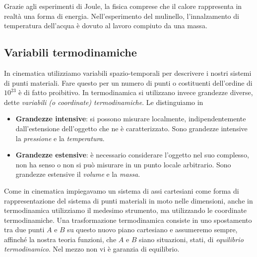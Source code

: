 Grazie agli esperimenti di Joule, la fisica comprese che il calore
rappresenta in realtà una forma di energia. Nell'esperimento del
mulinello, l'innalzamento di temperatura dell'acqua è dovuto al
lavoro compiuto da una massa.

























\subsection*{Variabili termodinamiche}
In cinematica utilizziamo variabili spazio-temporali per descrivere i nostri
sistemi di punti materiali. Fare questo per un numero di punti o costituenti
dell'ordine di $10^{23}$ è di fatto proibitivo. In termodinamica si utilizzano
invece grandezze diverse, dette \textit{variabili (o coordinate) termodinamiche}.
Le distinguiamo in

\begin{itemize}
    \item \textbf{Grandezze intensive}: si possono misurare localmente,
    indipendentemente dall'estensione dell'oggetto che ne è caratterizzato.
    Sono grandezze intensive la \textit{pressione} e la \textit{temperatura}.

    \item \textbf{Grandezze estensive}: è necessario considerare l'oggetto nel
    suo complesso, non ha senso o non si può misurare in un punto locale arbitrario.
    Sono grandezze estensive il \textit{volume} e la \textit{massa}.
\end{itemize}

\noindent Come in cinematica impiegavamo un sistema di assi cartesiani come
forma di rappresentazione del sistema di punti materiali in moto nelle dimensioni,
anche in termodinamica utilizziamo il medesimo strumento, ma utilizzando le
coordinate termodinamiche. Una trasformazione termodinamica consiste in uno
spostamento tra due punti $A$ e $B$ su questo nuovo piano cartesiano e assumeremo
sempre, affinché la nostra teoria funzioni, che $A$ e $B$ siano situazioni, stati, di
\textit{equilibrio termodinamico}. Nel mezzo non vi è garanzia di equilibrio.

